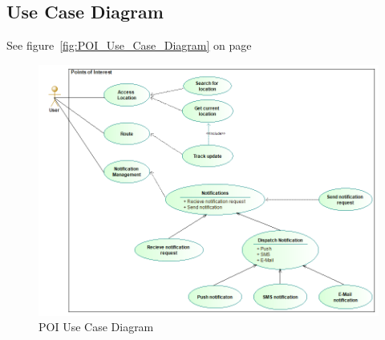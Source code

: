  \subsection{Use Case Diagram}
See figure~\ref{fig:POI_Use_Case_Diagram} on page~\pageref{fig:POI_Use_Case_Diagram}
\begin{figure}
	\centering
	\includegraphics[scale=0.54]{POI/poi_use_case_diagram.png}
	\caption{POI Use Case Diagram}
	\label{fig:POI_Use_Casee_Diagram}
\end{figure}
